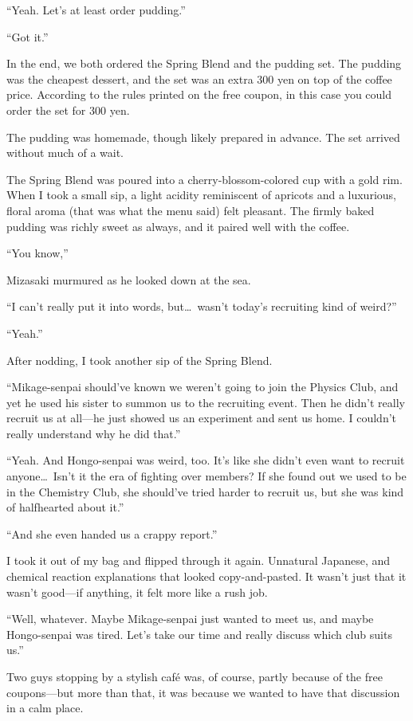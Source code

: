 \documentclass[
    a4paper,
    12pt,
    twoside,
    openany,
    UTF8,
    fontset=windows
]{ctexbook}
\begin{document}
``Yeah. Let's at least order pudding.''

``Got it.''

In the end, we both ordered the Spring Blend and the pudding set. The pudding was the cheapest dessert, and the set was an extra 300 yen on top of the coffee price. According to the rules printed on the free coupon, in this case you could order the set for 300 yen.

The pudding was homemade, though likely prepared in advance. The set arrived without much of a wait.

The Spring Blend was poured into a cherry-blossom-colored cup with a gold rim. When I took a small sip, a light acidity reminiscent of apricots and a luxurious, floral aroma (that was what the menu said) felt pleasant. The firmly baked pudding was richly sweet as always, and it paired well with the coffee.

``You know,''

Mizasaki murmured as he looked down at the sea.

``I can't really put it into words, but\dots\ wasn't today's recruiting kind of weird?''

``Yeah.''

After nodding, I took another sip of the Spring Blend.

``Mikage-senpai should've known we weren't going to join the Physics Club, and yet he used his sister to summon us to the recruiting event. Then he didn't really recruit us at all---he just showed us an experiment and sent us home. I couldn't really understand why he did that.''

``Yeah. And Hongo-senpai was weird, too. It's like she didn't even want to recruit anyone\dots\ Isn't it the era of fighting over members? If she found out we used to be in the Chemistry Club, she should've tried harder to recruit us, but she was kind of halfhearted about it.''

``And she even handed us a crappy report.''

I took it out of my bag and flipped through it again. Unnatural Japanese, and chemical reaction explanations that looked copy-and-pasted. It wasn't just that it wasn't good---if anything, it felt more like a rush job.

``Well, whatever. Maybe Mikage-senpai just wanted to meet us, and maybe Hongo-senpai was tired. Let's take our time and really discuss which club suits us.''

Two guys stopping by a stylish café was, of course, partly because of the free coupons---but more than that, it was because we wanted to have that discussion in a calm place.
\end{document}
